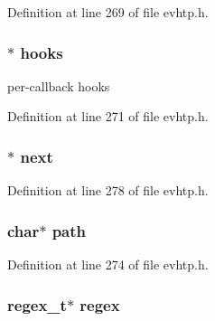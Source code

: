 Definition at line 269 of file evhtp.h.

\hypertarget{structevhtp__callback__s_ac97663394f74c9030e57c771cfb7981e}{
\subsubsection[{hooks}]{$\ast$ {\bf hooks}}}
\label{structevhtp__callback__s_ac97663394f74c9030e57c771cfb7981e}
per-\/callback hooks 

Definition at line 271 of file evhtp.h.

\hypertarget{structevhtp__callback__s_a1ded21f298b6aa22576e7530697b9a3d}{
\subsubsection[{next}]{$\ast$ {\bf next}}}
\label{structevhtp__callback__s_a1ded21f298b6aa22576e7530697b9a3d}


Definition at line 278 of file evhtp.h.

\hypertarget{structevhtp__callback__s_a44196e6a5696d10442c29e639437196e}{
\subsubsection[{path}]{\setlength{\rightskip}{0pt plus 5cm}char$\ast$ {\bf path}}}
\label{structevhtp__callback__s_a44196e6a5696d10442c29e639437196e}


Definition at line 274 of file evhtp.h.

\hypertarget{structevhtp__callback__s_af71a3fad7fee5d731252ce89e56f948f}{
\subsubsection[{regex}]{\setlength{\rightskip}{0pt plus 5cm}regex\_\-t$\ast$ {\bf regex}}}
\label{structevhtp__callback__s_af71a3fad7fee5d731252ce89e56f948f}


